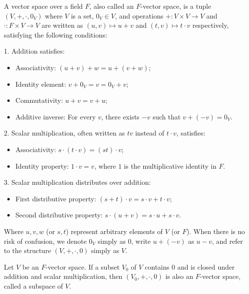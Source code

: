 \begin{definition}
  A vector space over a field $F$, also called an $F$-vector space, is a tuple $(V, +, \cdot, 0_V)$ where $V$ is a set, $0_V \in V$, and operations $+: V \times V \rightarrow V$ and $\cdot: F \times V \rightarrow V$ are written as $(u,v) \mapsto u + v$ and $(t,v) \mapsto t \cdot v$ respectively, satisfying the following conditions:

  1. Addition satisfies:
  \begin{itemize}
    \item Associativity: $(u + v) + w = u + (v + w)$;
    \item Identity element: $v + 0_V = v = 0_V + v$;
    \item Commutativity: $u + v = v + u$;
    \item Additive inverse: For every $v$, there exists $-v$ such that $v + (-v) = 0_V$.
  \end{itemize}

  2. Scalar multiplication, often written as $tv$ instead of $t \cdot v$, satisfies:
  \begin{itemize}
    \item Associativity: $s \cdot (t \cdot v) = (st) \cdot v$;
    \item Identity property: $1 \cdot v = v$, where $1$ is the multiplicative identity in $F$.
  \end{itemize}

  3. Scalar multiplication distributes over addition:
  \begin{itemize}
    \item First distributive property: $(s + t) \cdot v = s \cdot v + t \cdot v$;
    \item Second distributive property: $s \cdot (u + v) = s \cdot u + s \cdot v$.
  \end{itemize}

  Where $u, v, w$ (or $s, t$) represent arbitrary elements of $V$ (or $F$). When there is no risk of confusion, we denote $0_V$ simply as $0$, write $u + (-v)$ as $u - v$, and refer to the structure $(V, +, \cdot, 0)$ simply as $V$.
\end{definition}

\begin{definition}
  Let $V$ be an $F$-vector space. If a subset $V_0$ of $V$ contains $0$ and is closed under addition and scalar multiplication, then $(V_0, +, \cdot, 0)$ is also an $F$-vector space, called a subspace of $V$.
\end{definition}